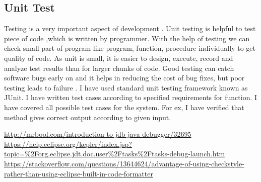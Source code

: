 \documentclass[a4paper,11pt]{report}
\begin{document}
 \subsection{Unit Test}
 Testing is a very important aspect of development . Unit testing is helpful to test piece of code ,which is written by programmer. With the help of  testing we can check small part of program like program, function, procedure individually to get quality of code.  As unit is small, it is easier to design, execute, record and analyze test results than for larger chunks of code. Good testing can catch software bugs early on and it  helps in reducing the cost of bug fixes, but poor testing  leads to failure . I have used standard unit testing framework known as JUnit.  I have written test cases according to specified requirements for function. I have covered all possible test cases for the system. For ex, I have verified that method gives correct output according to given input.
 


\begin{thebibliography}{9}
\url{http://mrbool.com/introduction-to-jdb-java-debugger/32695}
\url{https://help.eclipse.org/kepler/index.jsp?topic=%2Forg.eclipse.jdt.doc.user%2Ftasks%2Ftasks-debug-launch.htm}
\url{https://stackoverflow.com/questions/13644624/advantage-of-using-checkstyle-rather-than-using-eclipse-built-in-code-formatter}
\end{thebibliography}
\end{document}
